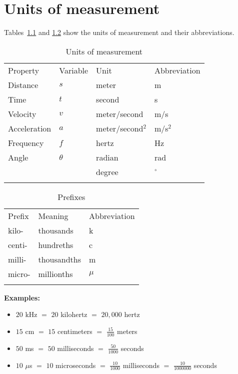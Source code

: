 
\chapter{Units of measurement}\label{ch.units}

Tables~\ref{tab.units} and \ref{tab.prefixes} show the units of measurement and their abbreviations.

\begin{table}
\caption{Units of measurement}
\label{tab.units}
\begin{tabular}{p{2cm}p{1.5cm}p{2.5cm}p{2cm}}
\svhline\noalign{\smallskip}
Property & Variable & Unit & Abbreviation \\
\noalign{\smallskip}\svhline\noalign{\smallskip}
Distance & $s$ & meter  & m\\
Time &  $t$ & second & s\\
Velocity & $v$ & meter/second &  m/s\\
Acceleration & $a$ & meter/second$^2$ & m/s$^2$\\
Frequency & $f$ & hertz & Hz\\
Angle & $\theta$ & radian & rad\\
& & degree & $^\circ$\\
\noalign{\smallskip}\svhline\noalign{\smallskip}
\end{tabular}
\end{table}

\begin{table}
\caption{Prefixes}
\label{tab.prefixes}
\begin{tabular}{p{1.5cm}p{2.2cm}p{1.7cm}}
\svhline\noalign{\smallskip}
Prefix & Meaning & Abbreviation \\
\noalign{\smallskip}\svhline\noalign{\smallskip}
kilo- & thousands & k\\
centi- & hundreths & c\\
milli- & thousandths & m\\
micro- & millionths & $\mu$\\
\noalign{\smallskip}\svhline\noalign{\smallskip}
\end{tabular}
\end{table}

\noindent\textbf{Examples:}

\begin{itemize}\setlength{\itemsep}{6pt}
\item $20$ kHz $=$ $20$ kilohertz $=$ $20,000$ hertz
\item $15$ cm $=$ $15$ centimeters $=$ $\frac{15}{100}$ meters
\item $50$ ms $=$ $50$ milliseconds $=$ $\frac{50}{1000}$ seconds
\item $10$ $\mu$s $=$ $10$ microseconds $=$ $\frac{10}{1000}$ milliseconds $=$ $\frac{10}{1000000}$ seconds
\end{itemize}

